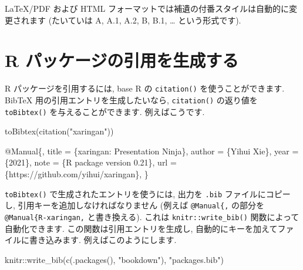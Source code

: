 \documentclass[
  11pt,
  lualatex,ja=standard,jafont=noto]{bxjsreport}
\newenvironment{Shaded}{\begin{snugshade}}{\end{snugshade}}
\newcommand{\DataTypeTok}[1]{\textcolor[rgb]{0.13,0.29,0.53}{#1}}
\newcommand{\FunctionTok}[1]{\textcolor[rgb]{0.00,0.00,0.00}{#1}}
\newcommand{\NormalTok}[1]{#1}
\newcommand{\SpecialCharTok}[1]{\textcolor[rgb]{0.00,0.00,0.00}{#1}}
\newcommand{\StringTok}[1]{\textcolor[rgb]{0.31,0.60,0.02}{#1}}
\newcommand{\VariableTok}[1]{\textcolor[rgb]{0.00,0.00,0.00}{#1}}
\begin{document}
LaTeX/PDF および HTML フォーマットでは補遺の付番スタイルは自動的に変更されます (たいていは A, A.1, A.2, B, B.1, \ldots{} という形式です).

\hypertarget{write-bib}{%
\section{R パッケージの引用を生成する}\label{write-bib}}

R パッケージを引用するには, base R の \texttt{citation()} を使うことができます. BibTeX 用の引用エントリを生成したいなら, \texttt{citation()} の返り値を \texttt{toBibtex()} を与えることができます. 例えばこうです.

\begin{Shaded}
\begin{Highlighting}[numbers=left,,]
\FunctionTok{toBibtex}\NormalTok{(}\FunctionTok{citation}\NormalTok{(}\StringTok{"xaringan"}\NormalTok{))}
\end{Highlighting}
\end{Shaded}

\begin{Shaded}
\begin{Highlighting}[]
\VariableTok{@Manual}\NormalTok{\{,}
  \DataTypeTok{title}\NormalTok{ = \{xaringan: Presentation Ninja\},}
  \DataTypeTok{author}\NormalTok{ = \{Yihui Xie\},}
  \DataTypeTok{year}\NormalTok{ = \{2021\},}
  \DataTypeTok{note}\NormalTok{ = \{R package version 0.21\},}
  \DataTypeTok{url}\NormalTok{ = \{https://github.com/yihui/xaringan\},}
\NormalTok{\}}
\end{Highlighting}
\end{Shaded}

\texttt{toBibtex()} で生成されたエントリを使うには, 出力を \texttt{.bib} ファイルにコピーし, 引用キーを追加しなければなりません (例えば \texttt{@Manual\{,} の部分を \texttt{@Manual\{R-xaringan,} と書き換える). これは \texttt{knitr::write\_bib()} 関数によって自動化できます. この関数は引用エントリを生成し, 自動的にキーを加えてファイルに書き込みます. 例えばこのようにします.

\begin{Shaded}
\begin{Highlighting}[numbers=left,,]
\NormalTok{knitr}\SpecialCharTok{::}\FunctionTok{write\_bib}\NormalTok{(}\FunctionTok{c}\NormalTok{(}\FunctionTok{.packages}\NormalTok{(), }\StringTok{"bookdown"}\NormalTok{), }\StringTok{"packages.bib"}\NormalTok{)}
\end{Highlighting}
\end{Shaded}
\end{document}
